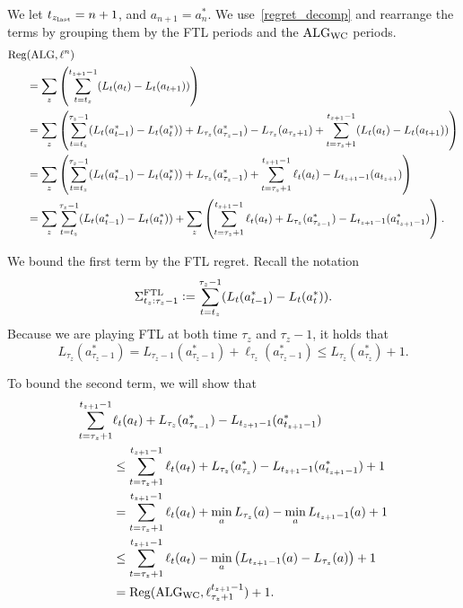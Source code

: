 We let $t_{z_{\mathrm{last}}} = n+1$, and $a_{n+1} = a_n^*$. We use~\cref{regret_decomp} and rearrange the terms by grouping them by the FTL periods and the $\text{ALG}_{\text{WC}}$ periods.
\begin{align}
\mathrm{Reg}&(\text{ALG}, \ell^n) \nonumber\\
&= \sum_z \left( \sum_{t=t_z}^{t_{z+1}-1} (L_t(a_t) - L_t(a_{t+1})) \right) \nonumber\\
&= \sum_z \left( \sum_{t=t_z}^{\tau_z-1} (L_t(a_{t-1}^*) - L_t(a_{t}^*))
+ L_{\tau_z}(a_{\tau_z-1}^*) - L_{\tau_z}(a_{\tau_z+1}) + \sum_{t=\tau_z+1}^{t_{z+1}-1} (L_t(a_t) - L_t(a_{t+1})) \right) \nonumber\\
&= \sum_z \left( \sum_{t=t_z}^{\tau_z-1} (L_t(a_{t-1}^*) - L_t(a_t^*)) + L_{\tau_z}(a_{\tau_z-1}^*) + \sum_{t=\tau_z+1}^{t_{z+1}-1} \ell_t(a_t) - L_{t_{z+1}-1}(a_{t_{z+1}}) \right) \nonumber\\
&= \sum_z \sum_{t=t_z}^{\tau_z-1} (L_t(a_{t-1}^*) - L_t(a_{t}^*)) + \sum_z \left(\sum_{t=\tau_z+1}^{t_{z+1}-1} \ell_t(a_t) + L_{\tau_z}(a_{\tau_{z-1}}^*) - L_{t_{z+1}-1}(a_{t_{z+1}-1}^*) \right). \nonumber
\end{align}

We bound the first term by the FTL regret. Recall the notation
\begin{align}
\Sigma^{\text{FTL}}_{t_z:\tau_z-1} := \sum_{t=t_z}^{\tau_z-1} (L_t(a_{t-1}^*) - L_t(a_{t}^*)).
\end{align}
Because we are playing FTL at both time $\tau_z$ and $\tau_z - 1$, it holds that 
\[L_{\tau_z}(a_{\tau_{z}-1}^*) = L_{\tau_z-1}(a_{\tau_{z}-1}^*) + \ell_{\tau_z}(a_{\tau_{z}-1}^*) \leq L_{\tau_z}(a_{\tau_{z}}^*) + 1.\]

To bound the second term, we will show that 
\begin{align}
\sum_{t=\tau_z+1}^{t_{z+1}-1} &\ell_t(a_t) + L_{\tau_z}(a_{\tau_{z-1}}^*) - L_{t_{z+1}-1}(a_{t_{z+1}-1}^*) 
\nonumber\\
&\leq \sum_{t=\tau_z+1}^{t_{z+1}-1} \ell_t(a_t) + L_{\tau_z}(a_{\tau_{z}}^*) - L_{t_{z+1}-1}(a_{t_{z+1}-1}^*) + 1 \\ 
&= \sum_{t=\tau_z+1}^{t_{z+1}-1} \ell_t(a_t) + \min_a L_{\tau_z}(a)  - \min_a L_{t_{z+1}-1}(a) +1\\ 
&\leq \sum_{t=\tau_z+1}^{t_{z+1}-1} \ell_t(a_t) - \min_a \left(L_{t_{z+1}-1}(a) - L_{\tau_z}(a)\right) + 1 \\
&= \mathrm{Reg}(\text{ALG}_{\text{WC}}, \ell_{\tau_z+1}^{t_{z+1}-1}) +1. 
\end{align}
\hfill\Halmos
\endproof

